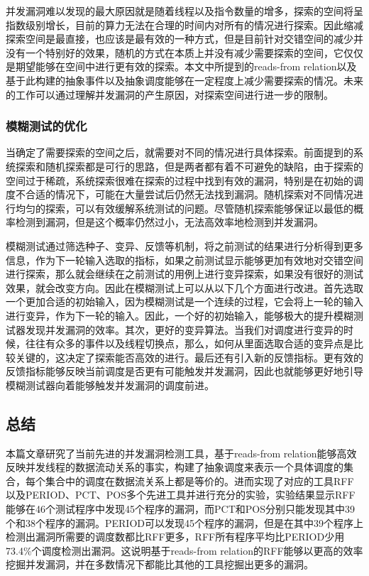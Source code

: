 并发漏洞难以发现的最大原因就是随着线程以及指令数量的增多，探索的空间将呈指数级别增长，目前的算力无法在合理的时间内对所有的情况进行探索。因此缩减探索空间是最直接，也应该是最有效的一种方式，但是目前针对交错空间的减少并没有一个特别好的效果，随机的方式在本质上并没有减少需要探索的空间，它仅仅是期望能够在空间中进行更有效的探索。本文中所提到的reads-from relation以及基于此构建的抽象事件以及抽象调度能够在一定程度上减少需要探索的情况。未来的工作可以通过理解并发漏洞的产生原因，对探索空间进行进一步的限制。

\subsubsection{模糊测试的优化}

当确定了需要探索的空间之后，就需要对不同的情况进行具体探索。前面提到的系统探索和随机探索都是可行的思路，但是两者都有着不可避免的缺陷，由于探索的空间过于稀疏，系统探索很难在探索的过程中找到有效的漏洞，特别是在初始的调度不合适的情况下，可能在大量尝试后仍然无法找到漏洞。随机探索对不同情况进行均匀的探索，可以有效缓解系统测试的问题。尽管随机探索能够保证以最低的概率检测到漏洞，但是这个概率仍然过小，无法高效率地检测到并发漏洞。

模糊测试通过筛选种子、变异、反馈等机制，将之前测试的结果进行分析得到更多信息，作为下一轮输入选取的指标，如果之前测试显示能够更加有效地对交错空间进行探索，那么就会继续在之前测试的用例上进行变异探索，如果没有很好的测试效果，就会改变方向。因此在模糊测试上可以从以下几个方面进行改进。首先选取一个更加合适的初始输入，因为模糊测试是一个连续的过程，它会将上一轮的输入进行变异，作为下一轮的输入。因此，一个好的初始输入，能够极大的提升模糊测试器发现并发漏洞的效率。其次，更好的变异算法。当我们对调度进行变异的时候，往往有众多的事件以及线程切换点，那么，如何从里面选取合适的变异点是比较关键的，这决定了探索能否高效的进行。最后还有引入新的反馈指标。更有效的反馈指标能够反映当前调度是否更有可能触发并发漏洞，因此也就能够更好地引导模糊测试器向着能够触发并发漏洞的调度前进。

\subsection{总结}

本篇文章研究了当前先进的并发漏洞检测工具，基于reads-from relation能够高效反映并发线程的数据流动关系的事实，构建了抽象调度来表示一个具体调度的集合，每个集合中的调度在数据流关系上都是等价的。进而实现了对应的工具RFF以及PERIOD、PCT、POS多个先进工具并进行充分的实验，实验结果显示RFF能够在46个测试程序中发现45个程序的漏洞，而PCT和POS分别只能发现其中39个和38个程序的漏洞。PERIOD可以发现45个程序的漏洞，但是在其中39个程序上检测出漏洞所需要的调度数都比RFF更多，RFF所有程序平均比PERIOD少用73.4\%个调度检测出漏洞。这说明基于reads-from relation的RFF能够以更高的效率挖掘并发漏洞，并在多数情况下都能比其他的工具挖掘出更多的漏洞。